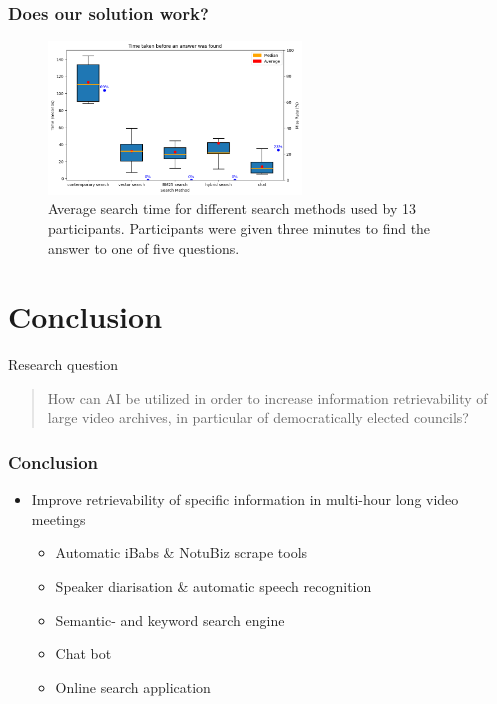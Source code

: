 \documentclass[aspectratio=169,sidebar]{uva-inf-presentation}
\begin{document}
\begin{frame}\frametitle{Does our solution work?}
\begin{figure}
    \centering
    \includegraphics[width=0.6\textwidth]{images/search_engine_results_2.png}
    \caption{Average search time for different search methods used by 13 participants. Participants were given three minutes to find the answer to one of five questions.}
    \label{fig:pipeline}
\end{figure}
\end{frame}


\section{Conclusion}
\begin{frame}{Research question}
    \begin{quote}
        How can AI be utilized in order to increase information retrievability of large video archives, in particular of democratically elected councils?
    \end{quote}
\end{frame}

\begin{frame}\frametitle{Conclusion}
\begin{itemize}
    \item Improve retrievability of specific information in multi-hour long video meetings
    \begin{itemize}
        \item Automatic iBabs \& NotuBiz scrape tools
        \item Speaker diarisation \& automatic speech recognition
        \item Semantic- and keyword search engine
        \item Chat bot
        \item Online search application
    \end{itemize}
\end{itemize}
\end{frame}

\end{document}
